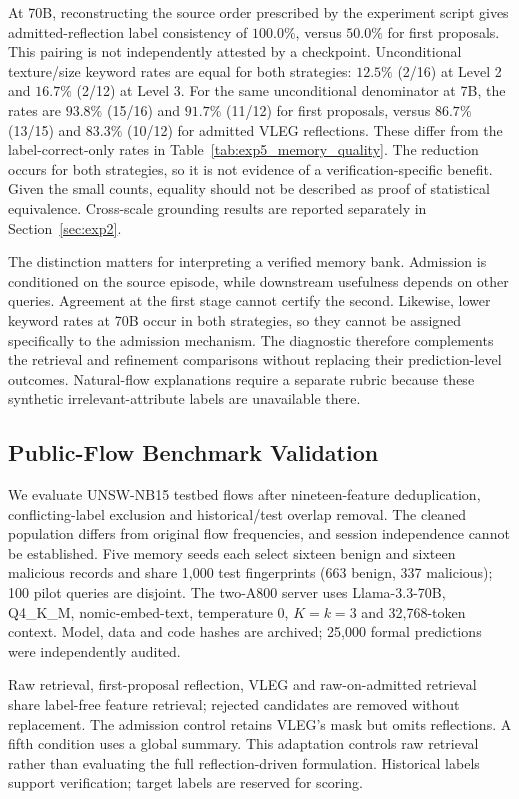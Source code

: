 \documentclass[onecolumn]{IEEEtran}
\numberwithin{equation}{section}
\theoremstyle{definition}
\theoremstyle{remark}
\begin{document}
At 70B, reconstructing the source order prescribed by the experiment script gives admitted-reflection label consistency of $100.0\%$, versus $50.0\%$ for first proposals. This pairing is not independently attested by a checkpoint. Unconditional texture/size keyword rates are equal for both strategies: $12.5\%$ (2/16) at Level 2 and $16.7\%$ (2/12) at Level 3. For the same unconditional denominator at 7B, the rates are $93.8\%$ (15/16) and $91.7\%$ (11/12) for first proposals, versus $86.7\%$ (13/15) and $83.3\%$ (10/12) for admitted VLEG reflections. These differ from the label-correct-only rates in Table~\ref{tab:exp5_memory_quality}. The reduction occurs for both strategies, so it is not evidence of a verification-specific benefit. Given the small counts, equality should not be described as proof of statistical equivalence. Cross-scale grounding results are reported separately in Section~\ref{sec:exp2}.

The distinction matters for interpreting a verified memory bank. Admission is conditioned on the source episode, while downstream usefulness depends on other queries. Agreement at the first stage cannot certify the second. Likewise, lower keyword rates at 70B occur in both strategies, so they cannot be assigned specifically to the admission mechanism. The diagnostic therefore complements the retrieval and refinement comparisons without replacing their prediction-level outcomes. Natural-flow explanations require a separate rubric because these synthetic irrelevant-attribute labels are unavailable there.

\FloatBarrier
\subsection{Public-Flow Benchmark Validation}
\label{sec:exp6}

We evaluate UNSW-NB15 testbed flows \cite{moustafa2015unsw} after nineteen-feature deduplication, conflicting-label exclusion and historical/test overlap removal. The cleaned population differs from original flow frequencies, and session independence cannot be established. Five memory seeds each select sixteen benign and sixteen malicious records and share 1,000 test fingerprints (663 benign, 337 malicious); 100 pilot queries are disjoint. The two-A800 server uses Llama-3.3-70B, Q4\_K\_M, nomic-embed-text, temperature $0$, $K=k=3$ and 32,768-token context. Model, data and code hashes are archived; 25,000 formal predictions were independently audited.

Raw retrieval, first-proposal reflection, VLEG and raw-on-admitted retrieval share label-free feature retrieval; rejected candidates are removed without replacement. The admission control retains VLEG's mask but omits reflections. A fifth condition uses a global summary. This adaptation controls raw retrieval rather than evaluating the full reflection-driven formulation. Historical labels support verification; target labels are reserved for scoring.
\end{document}
